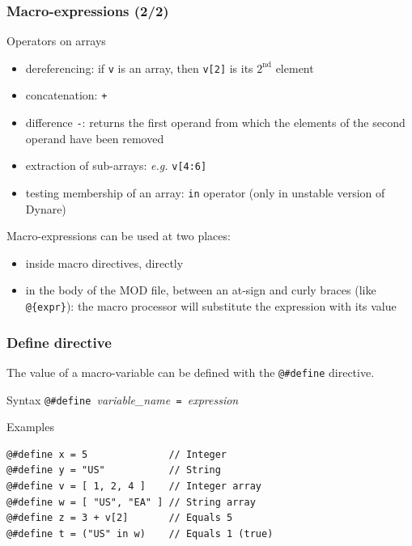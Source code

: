 \documentclass{beamer}
\begin{document}
\begin{frame}[fragile=singleslide]
  \frametitle{Macro-expressions (2/2)}
  \begin{block}{Operators on arrays}
    \begin{itemize}
    \item dereferencing: if \texttt{v} is an array, then \texttt{v[2]} is its $2^{\textrm{nd}}$ element
    \item concatenation: \texttt{+}
    \item difference \texttt{-}: returns the first operand from which the elements of the second operand have been removed
    \item extraction of sub-arrays: \textit{e.g.} \texttt{v[4:6]}
    \item testing membership of an array: \texttt{in} operator (only in unstable version of Dynare)
    \end{itemize}
  \end{block}

  Macro-expressions can be used at two places:
  \begin{itemize}
  \item inside macro directives, directly
  \item in the body of the MOD file, between an at-sign and curly braces (like \verb+@{expr}+): the macro processor will substitute the expression with its value
  \end{itemize}
\end{frame}

\begin{frame}[fragile=singleslide]
  \frametitle{Define directive}

  The value of a macro-variable can be defined with the \verb+@#define+ directive.

  \begin{block}{Syntax}
    \verb+@#define +\textit{variable\_name}\verb+ = +\textit{expression}
  \end{block}

  \begin{block}{Examples}
\begin{verbatim}
@#define x = 5              // Integer
@#define y = "US"           // String
@#define v = [ 1, 2, 4 ]    // Integer array
@#define w = [ "US", "EA" ] // String array
@#define z = 3 + v[2]       // Equals 5
@#define t = ("US" in w)    // Equals 1 (true)
\end{verbatim}
  \end{block}
\end{frame}
\end{document}
